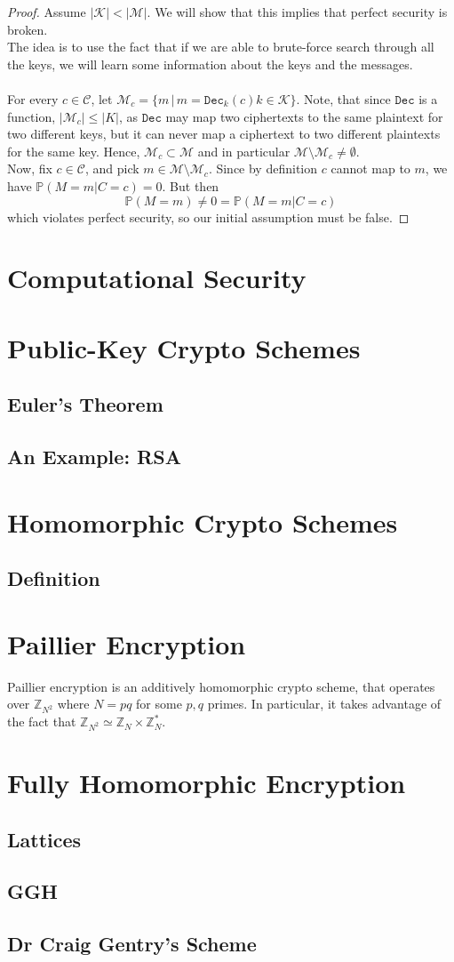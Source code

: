 \documentclass{article}
\theoremstyle{definition}
\newcommand{\Dec}{\texttt{Dec}}
\newcommand{\M}{\mathcal{M}}
\newcommand{\C}{\mathcal{C}}
\newcommand{\K}{\mathcal{K}}
\newcommand{\Prob}{\mathbb{P}}
\newcommand{\Int}{\mathbb{Z}}
\begin{document}
\begin{proof}
  Assume $|\K| < |\M|$. We will show that this implies that perfect security is broken.\\
  The idea is to use the fact that if we are able to brute-force search through
  all the keys, we will learn some information about the keys and the messages.
  \paragraph{}
  For every $c \in \C$, let $\M_c = \{m \,|\, m = \Dec_k(c) k \in \K\}$.
  Note, that since $\Dec$ is a function, $|\M_c| \leq |K|$, as $\Dec$ may map two ciphertexts
  to the same plaintext for two different keys, but it can never map a
  ciphertext to two different plaintexts for the same key. Hence, $\M_c \subset
  \M$ and in particular $\M \setminus \M_c \neq \emptyset$.\\
  Now, fix $c \in \C$, and pick $m \in \M \setminus \M_c$. Since by definition
  $c$ cannot map to $m$, we have $\Prob(M=m | C = c) = 0$. But then
  \[
    \Prob(M=m) \neq 0 = \Prob(M=m | C=c)
  \]
  which violates perfect security, so our initial assumption must be false.
\end{proof}
\section{Computational Security}
\section{Public-Key Crypto Schemes}
\subsection{Euler's Theorem}
\subsection{An Example: RSA}
\section{Homomorphic Crypto Schemes}
\subsection{Definition}
\section{Paillier Encryption}
Paillier encryption is an additively homomorphic crypto scheme, that operates
over $\Int_{N^2}$ where $N = pq$ for some $p, q$ primes. In particular, it takes advantage of the fact that $\Int_{N^2}
\simeq \Int_{N} \times \Int_{N}^*$. 
\section{Fully Homomorphic Encryption}
\subsection{Lattices}
\subsection{GGH}
\subsection{Dr Craig Gentry's Scheme}

\printbibliography
\end{document}
